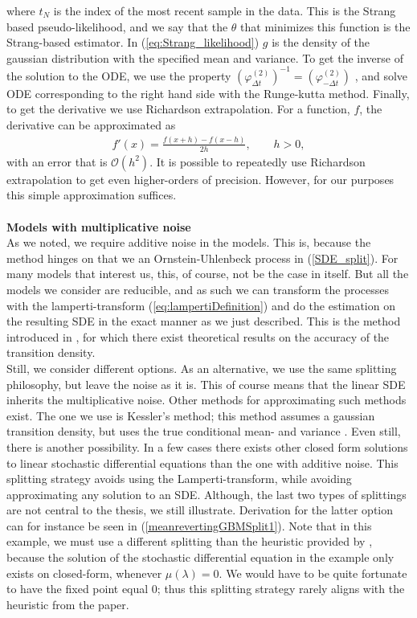 where $t_N$ is the index of the most recent sample in the data. This is the Strang based pseudo-likelihood, and we say that the $\theta$ that minimizes this function is the Strang-based estimator. In (\ref{eq:Strang_likelihood}) $g$ is the density of the gaussian distribution with the specified mean and variance. To get the inverse of the solution to the ODE, we use the property $\left(\varphi_{\Delta t}^{(2)}\right)^{-1} = \left(\varphi_{-\Delta t}^{(2)}\right)$ \cite[Remark below equation (9)]{SplittingSchemes}, and solve ODE corresponding to the right hand side with the Runge-kutta method. Finally, to get the derivative we use Richardson extrapolation. For a function, $f$, the derivative can be approximated as
\begin{align}
    f'(x) = \frac{f(x + h) - f(x - h)}{2h}, \qquad h > 0,
\end{align}
with an error that is $\mathcal{O}(h^2)$. It is possible to repeatedly use Richardson extrapolation to get even higher-orders of precision. However, for our purposes this simple approximation suffices.
\\\\
\textbf{Models with multiplicative noise}\\
As we noted, we require additive noise in the models. This is, because the method hinges on that we an Ornstein-Uhlenbeck process in (\ref{SDE_split}). For many models that interest us, this, of course, not be the case in itself. But all the models we consider are reducible, and as such we can transform the processes with the lamperti-transform (\ref{eq:lampertiDefinition}) and do the estimation on the resulting SDE in the exact manner as we just described. This is the method introduced in \cite{SplittingSchemes}, for which there exist theoretical results on the accuracy of the transition density.\\
Still, we consider different options. As an alternative, we use the same splitting philosophy, but leave the noise as it is. This of course means that the linear SDE inherits the multiplicative noise. Other methods for approximating such methods exist. The one we use is Kessler's method; this method assumes a gaussian transition density, but uses the true conditional mean- and variance \cite[equation (1.7)]{Kessler1997}. Even still, there is another possibility. In a few cases there exists other closed form solutions to linear stochastic differential equations than the one with additive noise. This splitting strategy avoids using the Lamperti-transform, while avoiding approximating any solution to an SDE. Although, the last two types of splittings are not central to the thesis, we still illustrate. Derivation for the latter option can for instance be seen in (\ref{meanrevertingGBMSplit1}). Note that in this example, we must use a different splitting than the heuristic provided by \cite[section 2.3 and 2.5]{SplittingSchemes}, because the solution of the stochastic differential equation in the example only exists on closed-form, whenever $\mu(\lambda) = 0$. We would have to be quite fortunate to have the fixed point equal 0; thus this splitting strategy rarely aligns with the heuristic from the paper.
